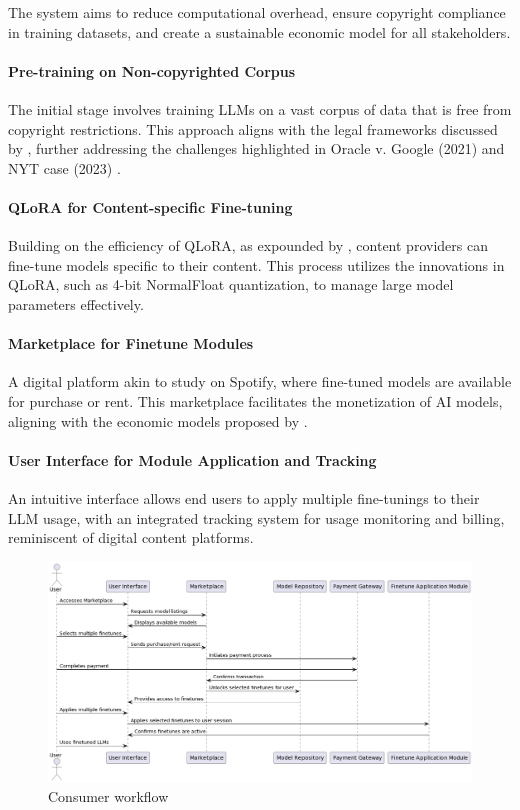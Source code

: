 \documentclass{article}
\begin{document}
The system aims to reduce computational overhead, ensure copyright compliance in training datasets, and create a sustainable economic model for all stakeholders.

\paragraph{Pre-training on Non-copyrighted Corpus} The initial stage involves training LLMs on a vast corpus of data that is free from copyright restrictions. This approach aligns with the legal frameworks discussed by \cite{GaonAviv2021Tfoc}, further addressing the challenges highlighted in Oracle v. Google (2021) \cite{enwiki:1187395454} and NYT case (2023) \cite{NYT_OpenAI_2023}.
\paragraph{QLoRA for Content-specific Fine-tuning} Building on the efficiency of QLoRA, as expounded by \cite{hu2021lora}, content providers can fine-tune models specific to their content. This process utilizes the innovations in QLoRA, such as 4-bit NormalFloat quantization, to manage large model parameters effectively.
\paragraph{Marketplace for Finetune Modules} A digital platform akin to \cite{NBERw24713} study on Spotify, where fine-tuned models are available for purchase or rent. This marketplace facilitates the monetization of AI models, aligning with the economic models proposed by \cite{10.7208/chicago/9780226613475.001.0001}.
\paragraph{User Interface for Module Application and Tracking} An intuitive interface allows end users to apply multiple fine-tunings to their LLM usage, with an integrated tracking system for usage monitoring and billing, reminiscent of digital content platforms.

\begin{figure}[ht]
    \centering
    \includegraphics[width=0.8\linewidth]{viz-2.png}
    \caption{Consumer workflow}
    \label{fig:consumer}
\end{figure}
\end{document}
